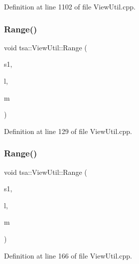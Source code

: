 Definition at line 1102 of file View\+Util.\+cpp.

\mbox{\label{classtsa_1_1_view_util_aee8e21e108474a2ca656868f1a32357f}} 
\subsubsection{\texorpdfstring{Range()}{Range()}\hspace{0.1cm}{\footnotesize\ttfamily [1/3]}}
{\footnotesize\ttfamily void tsa\+::\+View\+Util\+::\+Range (\begin{DoxyParamCaption}\item[{\hyperlink{namespacetsa_ac599574bcc094eda25613724b8f3ca9e}{Seq\+View\+Double} \&}]{s1,  }\item[{int}]{l,  }\item[{int}]{m }\end{DoxyParamCaption})\hspace{0.3cm}{\ttfamily [static]}}



Definition at line 129 of file View\+Util.\+cpp.

\mbox{\label{classtsa_1_1_view_util_a71ef0446b7182b629144446bf25c0301}} 
\subsubsection{\texorpdfstring{Range()}{Range()}\hspace{0.1cm}{\footnotesize\ttfamily [2/3]}}
{\footnotesize\ttfamily void tsa\+::\+View\+Util\+::\+Range (\begin{DoxyParamCaption}\item[{\hyperlink{namespacetsa_ab32775c889b53c40fa83939f22372b75}{Seq\+View\+Complex} \&}]{s1,  }\item[{int}]{l,  }\item[{int}]{m }\end{DoxyParamCaption})\hspace{0.3cm}{\ttfamily [static]}}



Definition at line 166 of file View\+Util.\+cpp.

\mbox{\label{classtsa_1_1_view_util_afd5ccdb844e5e7b0d3b6ff6668b1114f}} 
